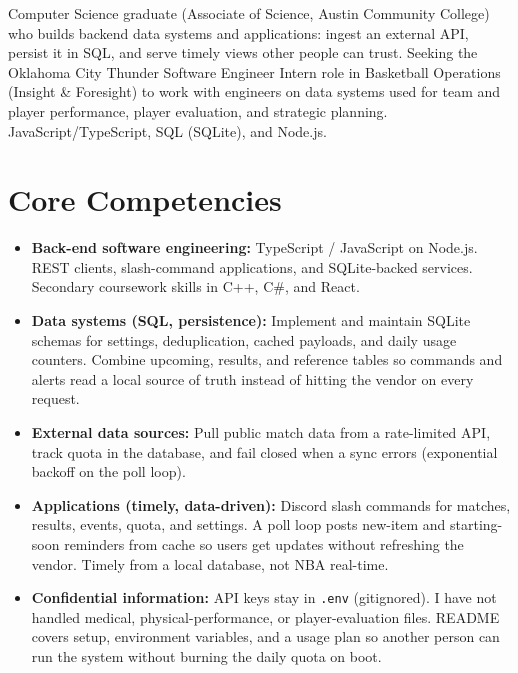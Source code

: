 \documentclass[11pt,a4paper,sans]{moderncv}
\begin{document}

\makecvtitle

\vspace{6pt}
\small{Computer Science graduate (Associate of Science, Austin Community College) who builds backend data systems and applications: ingest an external API, persist it in SQL, and serve timely views other people can trust. Seeking the Oklahoma City Thunder Software Engineer Intern role in Basketball Operations (Insight \& Foresight) to work with engineers on data systems used for team and player performance, player evaluation, and strategic planning. JavaScript/TypeScript, SQL (SQLite), and Node.js.}

\section{Core Competencies}
\vspace{1pt}
\begin{itemize}

\item \textbf{Back-end software engineering:} TypeScript / JavaScript on Node.js. REST clients, slash-command applications, and SQLite-backed services. Secondary coursework skills in C++, C\#, and React.

\item \textbf{Data systems (SQL, persistence):} Implement and maintain SQLite schemas for settings, deduplication, cached payloads, and daily usage counters. Combine upcoming, results, and reference tables so commands and alerts read a local source of truth instead of hitting the vendor on every request.

\item \textbf{External data sources:} Pull public match data from a rate-limited API, track quota in the database, and fail closed when a sync errors (exponential backoff on the poll loop).

\item \textbf{Applications (timely, data-driven):} Discord slash commands for matches, results, events, quota, and settings. A poll loop posts new-item and starting-soon reminders from cache so users get updates without refreshing the vendor. Timely from a local database, not NBA real-time.

\item \textbf{Confidential information:} API keys stay in \texttt{.env} (gitignored). I have not handled medical, physical-performance, or player-evaluation files. README covers setup, environment variables, and a usage plan so another person can run the system without burning the daily quota on boot.

\end{itemize}
\end{document}

